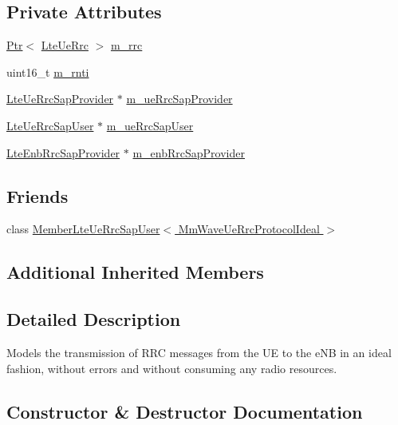 \subsection*{Private Attributes}
\begin{DoxyCompactItemize}
\item 
\hyperlink{classns3_1_1Ptr}{Ptr}$<$ \hyperlink{classns3_1_1LteUeRrc}{Lte\+Ue\+Rrc} $>$ \hyperlink{classns3_1_1MmWaveUeRrcProtocolIdeal_a1e179281b6e70e0e08b240f8c2a28f68}{m\+\_\+rrc}
\item 
uint16\+\_\+t \hyperlink{classns3_1_1MmWaveUeRrcProtocolIdeal_ad969a1d271c77ce56d83ec1db40bf5c9}{m\+\_\+rnti}
\item 
\hyperlink{classns3_1_1LteUeRrcSapProvider}{Lte\+Ue\+Rrc\+Sap\+Provider} $\ast$ \hyperlink{classns3_1_1MmWaveUeRrcProtocolIdeal_a707bd4ca365ec4629c8dadc50493d12a}{m\+\_\+ue\+Rrc\+Sap\+Provider}
\item 
\hyperlink{classns3_1_1LteUeRrcSapUser}{Lte\+Ue\+Rrc\+Sap\+User} $\ast$ \hyperlink{classns3_1_1MmWaveUeRrcProtocolIdeal_abc6f2ed7e6a41200ddf471b23630f1a1}{m\+\_\+ue\+Rrc\+Sap\+User}
\item 
\hyperlink{classns3_1_1LteEnbRrcSapProvider}{Lte\+Enb\+Rrc\+Sap\+Provider} $\ast$ \hyperlink{classns3_1_1MmWaveUeRrcProtocolIdeal_aa5c51eb8a3949fe14f190c0890f79862}{m\+\_\+enb\+Rrc\+Sap\+Provider}
\end{DoxyCompactItemize}
\subsection*{Friends}
\begin{DoxyCompactItemize}
\item 
class \hyperlink{classns3_1_1MmWaveUeRrcProtocolIdeal_ac582bbafe447f6bfc9ca66e8e7e44681}{Member\+Lte\+Ue\+Rrc\+Sap\+User$<$ Mm\+Wave\+Ue\+Rrc\+Protocol\+Ideal $>$}
\end{DoxyCompactItemize}
\subsection*{Additional Inherited Members}


\subsection{Detailed Description}
Models the transmission of R\+RC messages from the UE to the e\+NB in an ideal fashion, without errors and without consuming any radio resources. 

\subsection{Constructor \& Destructor Documentation}
